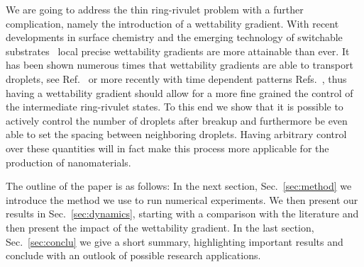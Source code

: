\documentclass[twoside,twocolumn,9pt]{article}
\begin{document}
We are going to address the thin ring-rivulet problem with a further complication, namely the introduction of a wettability gradient.
With recent developments in surface chemistry and the emerging technology of switchable substrates~\cite{xinReversiblySwitchableWettability2010, stuartEmergingApplicationsStimuliresponsive2010,chenThermalresponsiveHydrogelSurface2010, ichimuraLightDrivenMotionLiquids2000, mugeleElectrowettingConvenientWay2005} local precise wettability gradients are more attainable than ever.
It has been shown numerous times that wettability gradients are able to transport droplets, see Ref.~\cite{liuActuatingWaterDroplets2015} or more recently with time dependent patterns Refs.~\cite{grawitterSteeringDropletsSubstrates2021, zitzControllingDewettingMorphologies2023}, thus having a wettability gradient should allow for a more fine grained the control of the intermediate ring-rivulet states.
To this end we show that it is possible to actively control the number of droplets after breakup and furthermore be even able to set the spacing between neighboring droplets.
Having arbitrary control over these quantities will in fact make this process more applicable for the production of nanomaterials. 

The outline of the paper is as follows: In the next section, Sec.~\ref{sec:method} we introduce the method we use to run numerical experiments.
We then present our results in Sec.~\ref{sec:dynamics}, starting with a comparison with the literature and then present the impact of the wettability gradient.
In the last section, Sec.~\ref{sec:conclu} we give a short summary, highlighting important results and conclude with an outlook of possible research applications.
\end{document}
